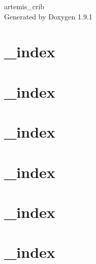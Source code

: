 \let\mypdfximage\pdfximage\def\pdfximage{\immediate\mypdfximage}\documentclass[twoside]{book}
\newcommand{\+}{\discretionary{\mbox{\scriptsize$\hookleftarrow$}}{}{}}
\newcommand{\clearemptydoublepage}{%
  \newpage{\pagestyle{empty}\cleardoublepage}%
}
\begin{document}
\raggedbottom

\hypersetup{pageanchor=false,
             bookmarksnumbered=true,
             pdfencoding=unicode
            }
\begin{titlepage}
\vspace*{7cm}
\begin{center}%
{\Large artemis\+\_\+crib }\\
\vspace*{1cm}
{\large Generated by Doxygen 1.9.1}\\
\end{center}
\end{titlepage}
\clearemptydoublepage
{}
\tableofcontents
\clearemptydoublepage
{}
\hypersetup{pageanchor=true}

\chapter{\+\_\+index}
\label{md_content__index}

\chapter{\+\_\+index}
\label{md_content_crib_parts__index}

\chapter{\+\_\+index}
\label{md_content_example__index}

\chapter{\+\_\+index}
\label{md_content_example_offline_analysis__index}

\chapter{\+\_\+index}
\label{md_content_example_online_analysis__index}

\chapter{\+\_\+index}
\label{md_content_example_preparation__index}

\end{document}
